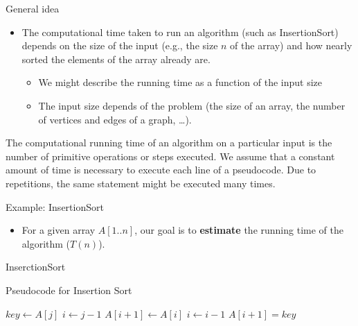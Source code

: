 \documentclass{beamer}
\begin{document}
\begin{frame}
    \begin{block}{ General idea}
      \begin{itemize}
       \item The computational time taken to run an algorithm (such as
       InsertionSort) depends on the size of the input (e.g., the size $n$
       of the array) and how nearly sorted the elements of the array already are.
       \begin{itemize}
        \item We might describe the running time as a function of the input size
        \item The input size depends of the problem (the size of an array, the number of
          vertices and edges of a graph, \ldots). 
       \end{itemize}
    \end{itemize}
  \end{block}  

\end{frame}

\begin{frame}
  The computational running time of an algorithm on a particular input is the
  number of primitive operations or steps executed. \pause We
  assume that a constant amount of time is necessary to
  execute each line of a pseudocode. \pause Due to repetitions, the
  same statement might be executed many times. 

  \begin{block}{Example: InsertionSort}
    \begin{itemize}
    \item For a given array $A[1..n]$, our goal is to
      {\bf estimate} the running time of the algorithm ($T(n)$). 
    \end{itemize}
  \end{block}
\end{frame}


\begin{frame}{InserctionSort}

  \begin{block}{Pseudocode for Insertion Sort}
\begin{scriptsize}
    \begin{algorithmic}
         \State $key \gets A[j]$                 
         \State $i \gets j-1$                    
            \State $A[i+1] \gets A[i]$           
            \State $i \gets i - 1$               
         \EndWhile
         \State $A[i+1] = key$                   
       \EndFor
    \EndProcedure
    \end{algorithmic}
  \end{scriptsize}  
  \end{block}
\end{frame} 
\end{document}
